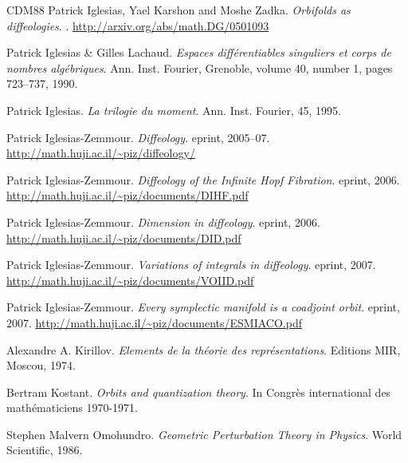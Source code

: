 \documentclass[10pt,reqno,twoside]{amsart}
\theoremstyle{plain}
\theoremstyle{definition}
\begin{document}
\begin{thebibliography}{CDM88}
    Patrick Iglesias, Yael Karshon and Moshe Zadka.
    \newblock \emph{Orbifolds as diffeologies}.
    .
    \newblock \url{http://arxiv.org/abs/math.DG/0501093}
    
    Patrick Iglesias \& Gilles Lachaud.
    \newblock \emph{Espaces diff\'erentiables singuliers et corps de nombres alg\'ebriques}.
    \newblock Ann. Inst. Fourier, Grenoble, volume 40, number 1, pages 723--737, 1990.
    
    Patrick Iglesias.
    \newblock \emph{La trilogie du moment}.
    \newblock Ann. Inst. Fourier, 45, 1995.
    
    Patrick Iglesias-Zemmour.
    \newblock \emph{Diffeology}.
    \newblock eprint, 2005--07.
    \newblock \url{http://math.huji.ac.il/~piz/diffeology/}
    
    Patrick Iglesias-Zemmour.
    \newblock \emph{Diffeology of the Infinite Hopf Fibration}.
    \newblock eprint, 2006.
    \newblock \url{http://math.huji.ac.il/~piz/documents/DIHF.pdf}
    
    Patrick Iglesias-Zemmour.
    \newblock \emph{Dimension in diffeology}.
    \newblock eprint, 2006.
    \newblock \url{http://math.huji.ac.il/~piz/documents/DID.pdf}
    
    Patrick Iglesias-Zemmour.
    \newblock \emph{Variations of integrals in diffeology}.
    \newblock eprint, 2007.
    \newblock \url{http://math.huji.ac.il/~piz/documents/VOIID.pdf}
    
    Patrick Iglesias-Zemmour.
    \newblock \emph{Every symplectic manifold is a coadjoint orbit}.
    \newblock eprint, 2007.
    \newblock \url{http://math.huji.ac.il/~piz/documents/ESMIACO.pdf}
    
    Alexandre A. Kirillov.
    \newblock \emph{Elements de la th\'eorie des repr\'esentations}.
    \newblock Editions MIR, Moscou, 1974.
    
    Bertram Kostant.
    \newblock \emph{Orbits and quantization theory}.
    \newblock In Congr\`es international des math\'ematiciens 1970-1971.
    
    Stephen Malvern Omohundro.
    \newblock \emph{Geometric Perturbation Theory in Physics}.
    \newblock World Scientific, 1986.
    

\end{thebibliography}
\end{document}
